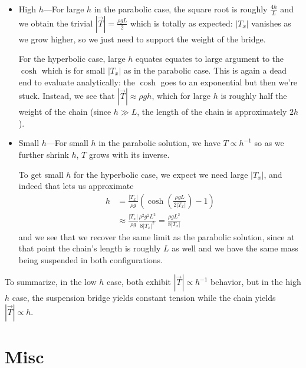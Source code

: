 \documentclass[12pt]{report}
\newcommand{\abs}[1]{\left|#1\right|}
\begin{document}
\begin{itemize}
    \item High $h$---For large $h$ in the parabolic case, the square root is
        roughly $\frac{4h}{L}$ and we obtain the trivial $\abs{\vec{T}} =
        \frac{\rho g L}{2}$ which is totally as expected: $\abs{T_x}$ vanishes
        as we grow higher, so we just need to support the weight of the bridge.

        For the hyperbolic case, large $h$ equates equates to large argument to
        the $\cosh$ which is for small $\abs{T_x}$ as in the parabolic case.
        This is again a dead end to evaluate analytically: the $\cosh$ goes to
        an exponential but then we're stuck. Instead, we see that $\abs{\vec{T}}
        \approx \rho g h$, which for large $h$ is roughly half the weight of the
        chain (since $h \gg L$, the length of the chain is approximately $2h$).

    \item Small $h$---For small $h$ in the parabolic solution, we have $T
        \propto h^{-1}$ so as we further shrink $h$, $T$ grows with its inverse.

        To get small $h$ for the hyperbolic case, we expect we need large
        $\abs{T_x}$, and indeed that lets us approximate
        \begin{align*}
            h
                &= \frac{\abs{T_x}}{\rho g}
                    \left(
                        \cosh\left( \frac{\rho g L}{2\abs{T_x}} \right) - 1
                    \right)\\
                &\approx \frac{\abs{T_x}}{\rho g}
                    \frac{\rho^2 g^2 L^2}{8 \abs{T_x}^2}
                    = \frac{\rho g L^2}{8\abs{T_x}}
        \end{align*}
        and we see that we recover the same limit as the parabolic solution,
        since at that point the chain's length is roughly $L$ as well and we
        have the same mass being suspended in both configurations.
\end{itemize}

To summarize, in the low $h$ case, both exhibit $\abs{\vec{T}} \propto h^{-1}$
behavior, but in the high $h$ case, the suspension bridge yields constant
tension while the chain yields $\abs{\vec{T}} \propto h$.

\section{Misc}
\end{document}
